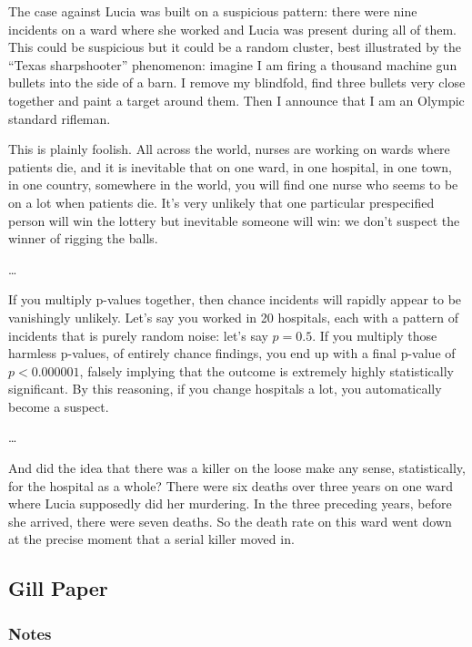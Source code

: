 \documentclass[letterpaper, landscape]{exam}
\begin{document}
  The case against Lucia was built on a suspicious pattern: there were nine
  incidents on a ward where she worked and Lucia was present during all of them.
  This could be suspicious but it could be a random cluster, best illustrated by
  the ``Texas sharpshooter'' phenomenon: imagine I am firing a thousand machine gun
  bullets into the side of a barn. I remove my blindfold, find three bullets
  very close together and paint a target around them. Then I announce that I am
  an Olympic standard rifleman.

  This is plainly foolish. All across the world, nurses are working on wards
  where patients die, and it is inevitable that on one ward, in one hospital, in
  one town, in one country, somewhere in the world, you will find one nurse who
  seems to be on a lot when patients die. It's very unlikely that one particular
  prespecified person will win the lottery but inevitable someone will win: we
  don't suspect the winner of rigging the balls.

  \dots

  If you multiply p-values together, then chance incidents will rapidly appear
  to be vanishingly unlikely. Let's say you worked in 20 hospitals, each with a
  pattern of incidents that is purely random noise: let's say $p = 0.5$. If you
  multiply those harmless p-values, of entirely chance findings, you end up with
  a final p-value of $p < 0.000001$, falsely implying that the outcome is
  extremely highly statistically significant. By this reasoning, if you change
  hospitals a lot, you automatically become a suspect.

  \dots

  And did the idea that there was a killer on the loose make any sense,
  statistically, for the hospital as a whole? There were six deaths over three
  years on one ward where Lucia supposedly did her murdering. In the three
  preceding years, before she arrived, there were seven deaths. So the death
  rate on this ward went down at the precise moment that a serial killer moved
  in.


  \subsection{Gill Paper} %
  
  \subsubsection{Notes} %
  
\end{document}
